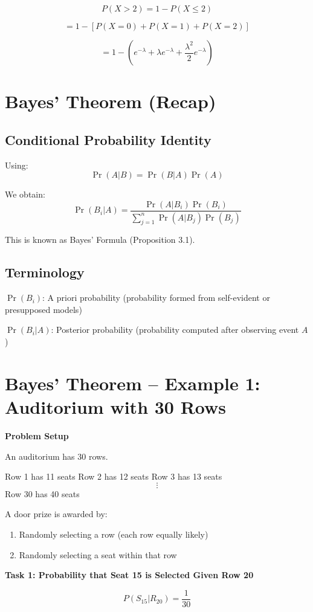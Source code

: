 \documentclass[12pt]{article}
\begin{document}
\[
P(X>2) = 1 - P(X \le 2)
\]

\[
= 1 - [P(X=0) + P(X=1) + P(X=2)]
\]

\[
= 1 - \left(e^{-\lambda} + \lambda e^{-\lambda} + \frac{\lambda^2}{2} e^{-\lambda}\right)
\]

\section{Bayes’ Theorem (Recap)}

\subsection{Conditional Probability Identity}

Using:
\[
\Pr(A|B) = \Pr(B|A)\Pr(A)
\]

We obtain:
\[
\Pr(B_i|A) =
\frac{\Pr(A|B_i)\Pr(B_i)}
{\sum_{j=1}^{n} \Pr(A|B_j)\Pr(B_j)}
\]

This is known as Bayes’ Formula (Proposition 3.1).

\subsection{Terminology}

$\Pr(B_i)$: A priori probability  
(probability formed from self-evident or presupposed models)

$\Pr(B_i|A)$: Posterior probability  
(probability computed after observing event $A$)

\section{Bayes’ Theorem – Example 1: Auditorium with 30 Rows}

\textbf{Problem Setup}

An auditorium has 30 rows.

Row 1 has 11 seats  
Row 2 has 12 seats  
Row 3 has 13 seats  
\[
\vdots
\]
Row 30 has 40 seats

A door prize is awarded by:
\begin{enumerate}
    \item Randomly selecting a row (each row equally likely)
    \item Randomly selecting a seat within that row
\end{enumerate}

\textbf{Task 1: Probability that Seat 15 is Selected Given Row 20}

\[
P(S_{15} | R_{20}) = \frac{1}{30}
\]
\end{document}
